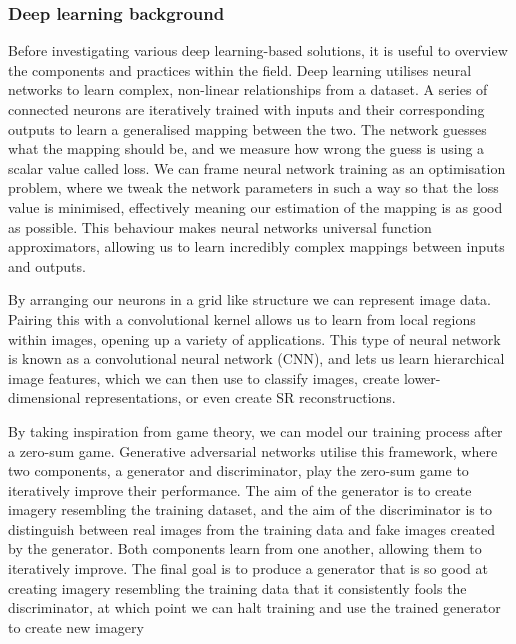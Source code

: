 \subsubsection{Deep learning background}
Before investigating various deep learning-based solutions, it is useful to overview the components and practices within the field. Deep learning utilises neural networks to learn complex, non-linear relationships from a dataset. A series of connected neurons are iteratively trained with inputs and their corresponding outputs to learn a generalised mapping between the two. The network guesses what the mapping should be, and we measure how wrong the guess is using a scalar value called loss. We can frame neural network training as an optimisation problem, where we tweak the network parameters in such a way so that the loss value is minimised, effectively meaning our estimation of the mapping is as good as possible. This behaviour makes neural networks universal function approximators, allowing us to learn incredibly complex mappings between inputs and outputs.

By arranging our neurons in a grid like structure we can represent image data. Pairing this with a convolutional kernel allows us to learn from local regions within images, opening up a variety of applications. This type of neural network is known as a convolutional neural network (CNN), and lets us learn hierarchical image features, which we can then use to classify images, create lower-dimensional representations, or even create SR reconstructions.

By taking inspiration from game theory, we can model our training process after a zero-sum game. Generative adversarial networks utilise this framework, where two components, a generator and discriminator, play the zero-sum game to iteratively improve their performance. The aim of the generator is to create imagery resembling the training dataset, and the aim of the discriminator is to distinguish between real images from the training data and fake images created by the generator. Both components learn from one another, allowing them to iteratively improve. The final goal is to produce a generator that is so good at creating imagery resembling the training data that it consistently fools the discriminator, at which point we can halt training and use the trained generator to create new imagery

